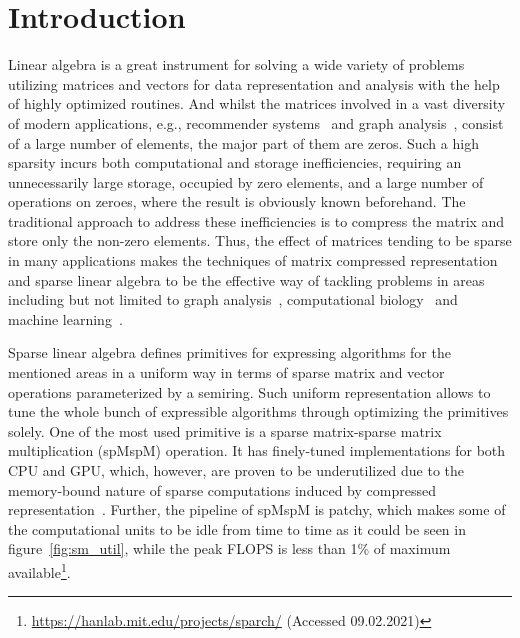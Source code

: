 \documentclass[10pt,conference]{IEEEtran}
\begin{document}
\section*{Introduction}
Linear algebra is a great instrument for solving a wide variety of problems utilizing matrices and vectors for data representation and analysis with the help of highly optimized routines.
And whilst the matrices involved in a vast diversity of modern applications, e.g., recommender systems~\cite{gupta2020architectural,amazon} and graph analysis~\cite{graph1,graph2}, consist of a large number of elements, the major part of them are zeros.
Such a high sparsity incurs both computational and storage inefficiencies, requiring an unnecessarily large storage, occupied by zero elements, and a large number of operations on zeroes, where the result is obviously known beforehand.
The traditional approach to address these inefficiencies is to compress the matrix and store only the non-zero elements. 
Thus, the effect of matrices tending to be sparse in many applications makes the techniques of matrix compressed representation and sparse linear algebra to be the effective way of tackling problems in areas including but not limited to graph analysis~\cite{GAILLA}, computational biology~\cite{compBio} and machine learning~\cite{Kepner_2017}.



Sparse linear algebra defines primitives for expressing algorithms for the mentioned areas in a uniform way in terms of sparse matrix and vector operations parameterized by a semiring.
Such uniform representation allows to tune the whole bunch of expressible algorithms through optimizing the primitives solely.
One of the most used primitive is a sparse matrix-sparse matrix multiplication (spMspM) operation. 
It has finely-tuned implementations for both CPU and GPU, which, however, are proven to be underutilized due to the memory-bound nature of sparse computations induced by compressed representation~\cite{Florida,leskovec2016snap,Song_2016,zhang2020sparch}.
Further, the pipeline of spMspM is patchy, which makes some of the computational units to be idle from time to time as it could be seen in figure~\ref{fig:sm_util}, while the peak FLOPS is less than 1\% of maximum available\footnote{\url{https://hanlab.mit.edu/projects/sparch/} (Accessed 09.02.2021)}. 
\end{document}
